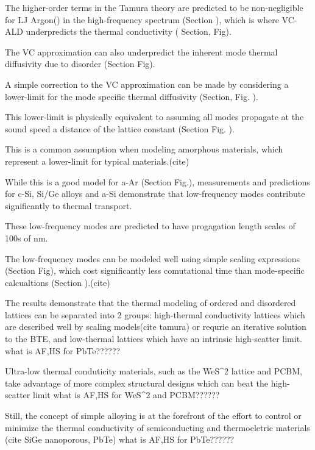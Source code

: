 \documentclass[aps,prb,onecolumn,preprint,superscriptaddress,amsmath,amssymb,floatfix]{revtex4}
\begin{document}
The higher-order terms in the Tamura theory are predicted to be 
non-negligible for LJ Argon() in the high-frequency spectrum (Section ), 
which is where VC-ALD underpredicts the thermal 
conductivity ( Section, Fig). 

The VC approximation can also underpredict the inherent mode thermal 
diffusivity due to disorder (Section Fig). 

A simple correction to the VC approximation can be made by considering 
a lower-limit for the mode specific thermal diffusivity (Section, Fig. ). 

This lower-limit is physically equivalent to assuming all modes 
propagate at the sound speed a distance of the lattice constant 
(Section Fig. ).

This is a common assumption when modeling amorphous materials, which 
represent a lower-limit for typical materials.(cite)

While this is a good model for a-Ar (Section Fig.), measurements and 
predictions for c-Si, Si/Ge alloys 
and a-Si demonstrate that low-frequency 
modes contribute significantly to thermal transport. 

These 
low-frequency modes are predicted to have progagation length scales 
of 100s of nm. 

The low-frequency modes can be modeled well using simple scaling 
expressions (Section Fig), which cost significantly less 
comutational time than mode-specific calcualtions (Section ).(cite) 

The results demonstrate that the thermal modeling of ordered and 
disordered lattices can be separated into 2 groups: high-thermal 
conductivity lattices which are described well by scaling models(cite tamura) 
or requrie an iterative solution to the BTE, and low-thermal 
lattices which have an intrinsic high-scatter limit. 
what is AF,HS for PbTe??????

Ultra-low thermal conduticity materials, such as the WeS^2 lattice 
and PCBM, take advantage of more complex structural designs which can 
beat the high-scatter limit 
what is AF,HS for WeS^2 and PCBM??????

Still, the concept of simple alloying is at the forefront of the effort 
to control or minimize the thermal conductivity of semiconducting and 
thermoeletric materials (cite SiGe nanoporous, PbTe)
what is AF,HS for PbTe??????
\end{document}
